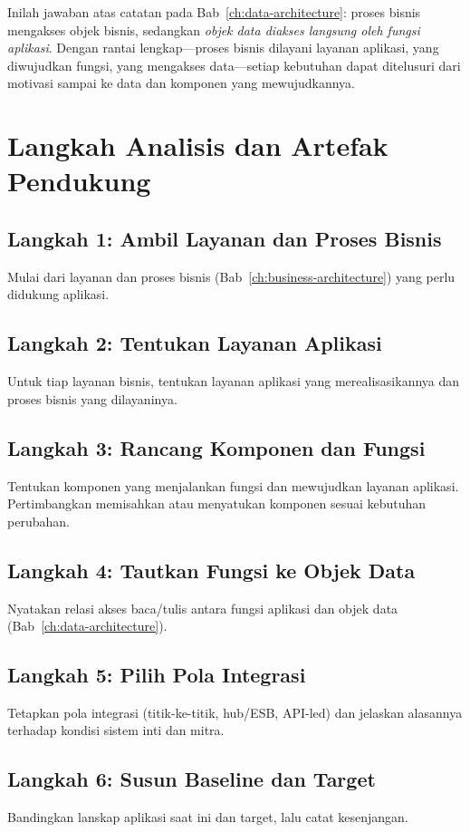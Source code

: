 Inilah jawaban atas catatan pada Bab~\ref{ch:data-architecture}: proses bisnis
mengakses objek bisnis, sedangkan \emph{objek data diakses langsung oleh fungsi
aplikasi}. Dengan rantai lengkap---proses bisnis dilayani layanan aplikasi, yang
diwujudkan fungsi, yang mengakses data---setiap kebutuhan dapat ditelusuri dari
motivasi sampai ke data dan komponen yang mewujudkannya.

\section{Langkah Analisis dan Artefak Pendukung}

\subsection{Langkah 1: Ambil Layanan dan Proses Bisnis}
Mulai dari layanan dan proses bisnis (Bab~\ref{ch:business-architecture}) yang
perlu didukung aplikasi.

\subsection{Langkah 2: Tentukan Layanan Aplikasi}
Untuk tiap layanan bisnis, tentukan layanan aplikasi yang merealisasikannya dan
proses bisnis yang dilayaninya.

\subsection{Langkah 3: Rancang Komponen dan Fungsi}
Tentukan komponen yang menjalankan fungsi dan mewujudkan layanan aplikasi.
Pertimbangkan memisahkan atau menyatukan komponen sesuai kebutuhan perubahan.

\subsection{Langkah 4: Tautkan Fungsi ke Objek Data}
Nyatakan relasi akses baca/tulis antara fungsi aplikasi dan objek data
(Bab~\ref{ch:data-architecture}).

\subsection{Langkah 5: Pilih Pola Integrasi}
Tetapkan pola integrasi (titik-ke-titik, hub/ESB, API-led) dan jelaskan
alasannya terhadap kondisi sistem inti dan mitra.

\subsection{Langkah 6: Susun Baseline dan Target}
Bandingkan lanskap aplikasi saat ini dan target, lalu catat kesenjangan.

